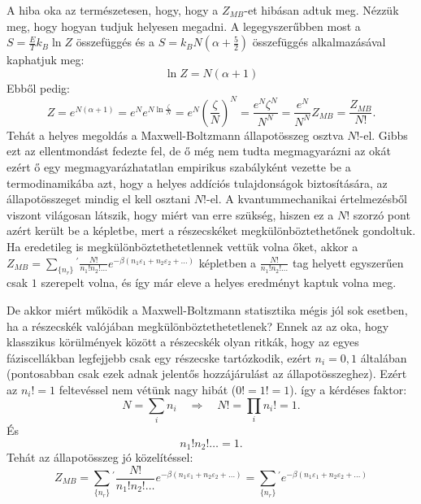 \documentclass[../main.tex]{subfiles}
\begin{document}
A hiba oka az természetesen, hogy, hogy a $Z_{MB}$-et hibásan adtuk meg. Nézzük meg, hogy hogyan tudjuk helyesen megadni. A legegyszerűbben most a $S = \frac{E}{T} k_B \ln Z$ összefüggés
és a $S = k_B N \left(\alpha + \frac{5}{2}\right)$ összefüggés alkalmazásával kaphatjuk meg:
\begin{equation}
    \ln Z = N (\alpha + 1)
\end{equation}
Ebből pedig:
\begin{equation}
    Z = e^{N(\alpha + 1)} = e^N e^{N \ln \frac{\zeta}{N}} = e^N \left(\frac{\zeta}{N}\right)^N = \frac{e^N \zeta^N}{N^N} = \frac{e^N}{N^N} Z_{MB} = \frac{Z_{MB}}{N!}.
\end{equation}
Tehát a helyes megoldás a Maxwell-Boltzmann állapotösszeg osztva $N!$-el. Gibbs ezt az ellentmondást fedezte fel, de ő még nem tudta megmagyarázni az okát ezért ő egy megmagyarázhatatlan
empirikus szabályként vezette be a termodinamikába azt, hogy a helyes addíciós tulajdonságok biztosítására, az állapotösszeget mindig el kell osztani $N!$-el. A kvantummechanikai értelmezésből viszont
világosan látszik, hogy miért van erre szükség, hiszen ez a $N!$ szorzó pont azért került be a képletbe, mert a részecskéket megkülönböztethetőnek gondoltuk. Ha eredetileg is megkülönböztethetetlennek 
vettük volna őket, akkor a $Z_{MB} = \sum_{\{n_r\}}^{}{}^{'} \frac{N!}{n_1! n_2! \ldots} e^{-\beta (n_1 \varepsilon_1 + n_2 \varepsilon_2 + \ldots)}$ képletben a $\frac{N!}{n_1! n_2! \ldots}$ tag helyett
egyszerűen csak $1$ szerepelt volna, és így már eleve a helyes eredményt kaptuk volna meg.

De akkor miért működik a Maxwell-Boltzmann statisztika mégis jól sok esetben, ha a részecskék valójában megkülönböztethetetlenek? Ennek az az oka, hogy klasszikus körülmények között a részecskék
olyan ritkák, hogy az egyes fáziscellákban legfejjebb csak egy részecske tartózkodik, ezért $n_i = 0,1$ általában (pontosabban csak ezek adnak jelentős hozzájárulást az állapotösszeghez). Ezért az
$n_i! = 1$ feltevéssel nem vétünk nagy hibát ($0! = 1! = 1$). így a kérdéses faktor:
\begin{equation}
    N = \sum_i n_i \quad \Rightarrow \quad N! = \prod_i n_i! = 1.
\end{equation}
És 
\begin{equation}
    n_1! n_2! \ldots = 1.
\end{equation}
Tehát az állapotösszeg jó közelítéssel:
\begin{equation}
    Z_{MB} = \sum_{\{n_r\}}^{}{}^{'} \frac{N!}{n_1! n_2! \ldots} e^{-\beta (n_1 \varepsilon_1 + n_2 \varepsilon_2 + \ldots)} = \sum_{\{n_r\}}^{}{}^{'} e^{-\beta (n_1 \varepsilon_1 + n_2 \varepsilon_2 + \ldots)}
\end{equation}
\end{document}
